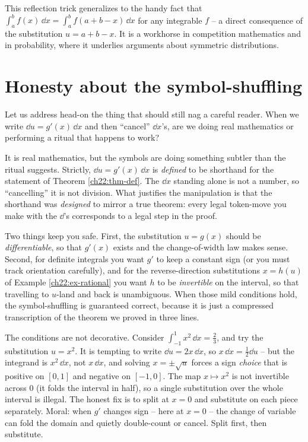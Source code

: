 \begin{connectionbox}
This reflection trick generalizes to the handy fact that $\int_a^b f(x)\,\dd x =
\int_a^b f(a+b-x)\,\dd x$ for any integrable $f$ -- a direct consequence of the
substitution $u = a+b-x$. It is a workhorse in competition mathematics and in
probability, where it underlies arguments about symmetric distributions.
\end{connectionbox}

\section{Honesty about the symbol-shuffling}
\label{ch22:honesty}

Let us address head-on the thing that should still nag a careful reader. When we
write $\dd u = g'(x)\,\dd x$ and then ``cancel'' $\dd x$'s, are we doing real
mathematics or performing a ritual that happens to work?

\begin{happeningbox}
It is real mathematics, but the symbols are doing something subtler than the ritual
suggests. Strictly, $\dd u = g'(x)\,\dd x$ is \emph{defined} to be shorthand for the
statement of Theorem \ref{ch22:thm-def}. The $\dd x$ standing alone is not a number,
so ``cancelling'' it is not division. What justifies the manipulation is that the
shorthand was \emph{designed} to mirror a true theorem: every legal token-move you
make with the $\dd$'s corresponds to a legal step in the proof.

Two things keep you safe. First, the substitution $u=g(x)$ should be
\emph{differentiable}, so that $g'(x)$ exists and the change-of-width law makes
sense. Second, for definite integrals you want $g'$ to keep a constant sign (or you
must track orientation carefully), and for the reverse-direction substitutions
$x=h(u)$ of Example \ref{ch22:ex-rational} you want $h$ to be \emph{invertible} on
the interval, so that travelling to $u$-land and back is unambiguous. When those
mild conditions hold, the symbol-shuffling is guaranteed correct, because it is just
a compressed transcription of the theorem we proved in three lines.
\end{happeningbox}

\begin{trapbox}
The conditions are not decorative. Consider $\int_{-1}^{1} x^2\,\dd x = \tfrac23$,
and try the substitution $u = x^2$. It is tempting to write $\dd u = 2x\,\dd x$, so
$x\,\dd x = \tfrac12\dd u$ -- but the integrand is $x^2\,\dd x$, not $x\,\dd x$, and
solving $x = \pm\sqrt u$ forces a sign \emph{choice} that is positive on $[0,1]$ and
negative on $[-1,0]$. The map $x\mapsto x^2$ is not invertible across $0$ (it folds
the interval in half), so a single substitution over the whole interval is illegal.
The honest fix is to split at $x=0$ and substitute on each piece separately. Moral:
when $g'$ changes sign -- here at $x=0$ -- the change of variable can fold the domain
and quietly double-count or cancel. Split first, then substitute.
\end{trapbox}

